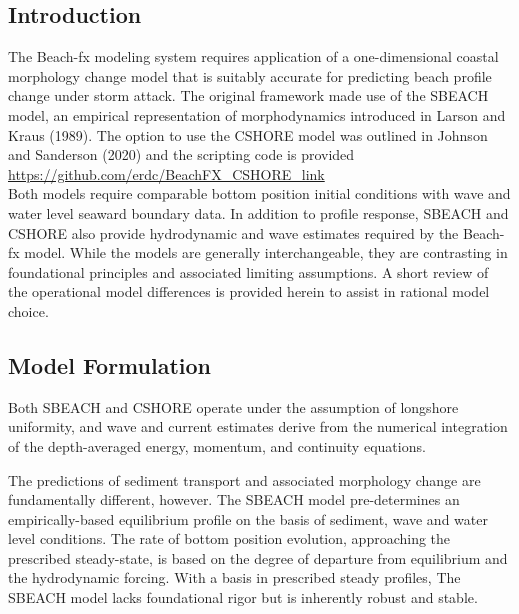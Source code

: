 \documentclass[11pt]{article}
\begin{document}
\subsection*{Introduction}
The Beach-fx modeling system requires application of a
one-dimensional coastal morphology change model that is suitably
accurate for predicting beach profile change under storm attack.  The
original framework made use of the SBEACH model, an empirical
representation of morphodynamics introduced in Larson and Kraus (1989).
The option to use the CSHORE model was outlined in Johnson and
Sanderson (2020) and the scripting code is provided \\
\href{https://github.com/erdc/BeachFX_CSHORE_link}{https://github.com/erdc/BeachFX\_CSHORE\_link}\\
Both models require comparable bottom position initial conditions with
wave and water level seaward boundary data.  In addition to profile
response, SBEACH and CSHORE also provide hydrodynamic and wave 
estimates required by the Beach-fx model.  While the models are
generally interchangeable, they are contrasting in foundational
principles and associated limiting assumptions.  A short review of the
operational model differences is provided herein to assist in rational
model choice.



\subsection*{Model Formulation} 

Both SBEACH and CSHORE operate under the assumption of longshore
uniformity, and wave and current estimates derive from the numerical
integration of the depth-averaged energy, momentum, and continuity
equations.

The predictions of sediment transport and associated morphology change
are fundamentally different, however.  The SBEACH model pre-determines
an empirically-based equilibrium profile on the basis of sediment, wave and
water level conditions.  The rate of bottom position evolution,
approaching the prescribed steady-state, is based on the degree of
departure from equilibrium and the hydrodynamic forcing.  With a basis
in prescribed steady profiles, The SBEACH model lacks foundational rigor
but is inherently robust and stable.
\end{document}
